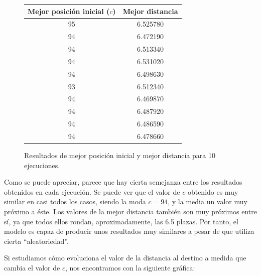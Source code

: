 \documentclass[11pt,a4paper]{report}
\begin{document}
\begin{figure}[H]
\centering
\begin{tabular}{c|c}
\textbf{Mejor posición inicial ($c$)} & \textbf{Mejor distancia} \\ \hline
95                              & 6.525780                 \\
94                              & 6.472190                 \\
94                              & 6.513340                 \\
94                              & 6.531020                 \\
94                              & 6.498630                 \\
93                              & 6.512340                 \\
94                              & 6.469870                 \\
94                              & 6.487920                 \\
94                              & 6.486590                 \\
94                              & 6.478660                
\end{tabular}
\caption{Resultados de mejor posición inicial y mejor distancia para 10 ejecuciones.}
\end{figure}

Como se puede apreciar, parece que hay cierta semejanza entre los resultados obtenidos en cada
ejecución. Se puede ver que el valor de $c$ obtenido es muy similar en casi todos los casos, siendo
la moda $c = 94$, y la media un valor muy próximo a éste. Los valores de la mejor distancia también
son muy próximos entre sí, ya que todos ellos rondan, aproximadamente, las 6.5 plazas. Por tanto, el
modelo es capaz de producir unos resultados muy similares a pesar de que utiliza cierta ``aleatoriedad''.

Si estudiamos cómo evoluciona el valor de la distancia al destino a medida que cambia el valor de $c$, nos
encontramos con la siguiente gráfica:
\end{document}
